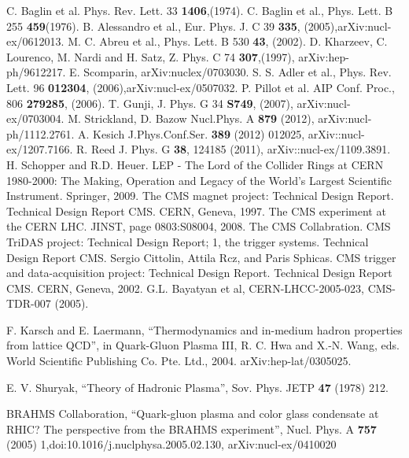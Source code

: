 \begin{thebibliography}{999}
 C. Baglin et al. Phys. Rev. Lett. 33 {\bf 1406},(1974).
 C. Baglin et al., Phys. Lett. B 255 {\bf 459}(1976).
 B. Alessandro et al., Eur. Phys. J. C 39 {\bf 335}, (2005),arXiv:nucl-ex/0612013.
 M. C. Abreu et al., Phys. Lett. B 530 {\bf 43}, (2002).
 D. Kharzeev, C. Lourenco, M. Nardi and H. Satz, Z. Phys. C 74 {\bf 307},(1997), arXiv:hep-ph/9612217.
 E. Scomparin, arXiv:nuclex/0703030.
 S. S. Adler et al., Phys. Rev. Lett. 96 {\bf 012304}, (2006),arXiv:nucl-ex/0507032.
 P. Pillot et al. AIP Conf. Proc., 806 {\bf 279285}, (2006).
 T. Gunji, J. Phys. G 34 {\bf S749}, (2007), arXiv:nucl-ex/0703004.
  M. Strickland, D. Bazow Nucl.Phys. A {\bf 879} (2012), arXiv:nucl-ph/1112.2761.
 A. Kesich J.Phys.Conf.Ser. {\bf 389} (2012) 012025, arXiv::nucl-ex/1207.7166.
 R. Reed J. Phys. G {\bf 38}, 124185 (2011), arXiv::nucl-ex/1109.3891.
 H. Schopper and R.D. Heuer. LEP - The Lord of the Collider Rings at CERN
1980-2000: The Making, Operation and Legacy of the World's Largest Scientific
Instrument. Springer, 2009.
 The CMS magnet project: Technical Design Report. Technical Design Report
CMS. CERN, Geneva, 1997.
 The CMS experiment at the CERN LHC. JINST, page 0803:S08004, 2008.
 The CMS Collabration. CMS TriDAS project: Technical Design Report; 1, the
trigger systems. Technical Design Report CMS.
 Sergio Cittolin, Attila Rcz, and Paris Sphicas. CMS trigger and data-acquisition
project: Technical Design Report. Technical Design Report CMS. CERN,
Geneva, 2002.
 G.L. Bayatyan et al, CERN-LHCC-2005-023, CMS-TDR-007 (2005).

F. Karsch and E. Laermann, ``Thermodynamics and in-medium hadron properties from
lattice QCD'', in Quark-Gluon Plasma III, R. C. Hwa and X.-N. Wang, eds. World Scientific
Publishing Co. Pte. Ltd., 2004. arXiv:hep-lat/0305025. 

E. V. Shuryak, ``Theory of Hadronic Plasma'', Sov. Phys. JETP {\bf 47} (1978) 212.


BRAHMS Collaboration, ``Quark-gluon plasma and color glass condensate at RHIC? The
perspective from the BRAHMS experiment'', Nucl. Phys. A {\bf 757} (2005) 1,doi:10.1016/j.nuclphysa.2005.02.130, 
arXiv:nucl-ex/0410020


\end{thebibliography}
